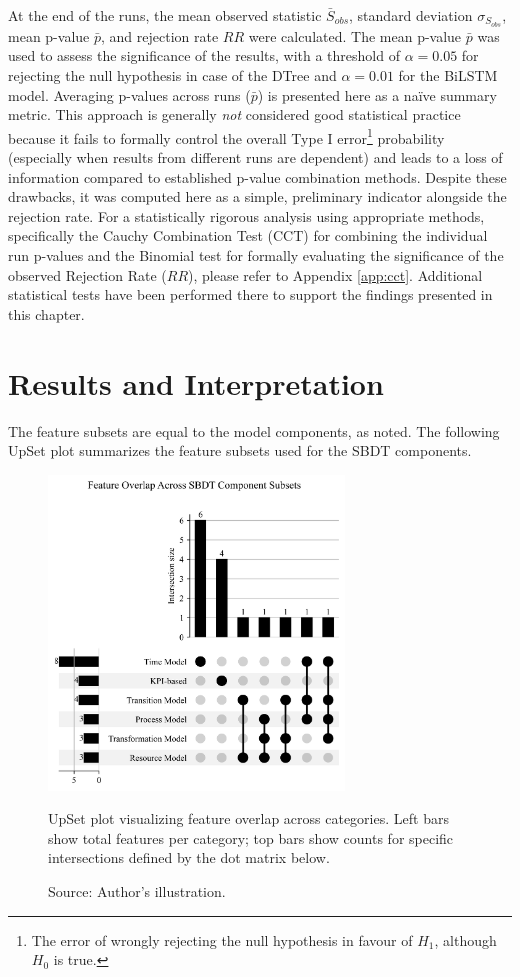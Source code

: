At the end of the runs, the mean observed statistic $\bar{S}_{obs}$, standard deviation $\sigma_{S_{obs}}$, mean p-value $\bar{p}$, and rejection rate $RR$ were calculated. The mean p-value $\bar{p}$ was used to assess the significance of the results, with a threshold of $\alpha = 0.05$ for rejecting the null hypothesis in case of the DTree and $\alpha = 0.01$ for the BiLSTM model. Averaging p-values across runs ($\bar{p}$) is presented here as a naïve summary metric. This approach is generally \textit{not} considered good statistical practice because it fails to formally control the overall Type I error\footnote{The error of wrongly rejecting the null hypothesis in favour of $H_1$, although $H_0$ is true.} probability (especially when results from different runs are dependent) and leads to a loss of information compared to established p-value combination methods. Despite these drawbacks, it was computed here as a simple, preliminary indicator alongside the rejection rate. For a statistically rigorous analysis using appropriate methods, specifically the Cauchy Combination Test (CCT) for combining the individual run p-values and the Binomial test for formally evaluating the significance of the observed Rejection Rate ($RR$), please refer to Appendix \ref{app:cct}. Additional statistical tests have been performed there to support the findings presented in this chapter.

\section{Results and Interpretation}
The feature subsets are equal to the model components, as noted. The following UpSet plot summarizes the feature subsets used for the SBDT components.

\begin{figure}[htbp]
    \centering
    \includegraphics[width=0.7\textwidth]{figures/upset.png}
    \caption[UpSet Plot]{UpSet plot visualizing feature overlap across categories. Left bars show total features per category; top bars show counts for specific intersections defined by the dot matrix below.}
    \caption*{Source: Author's illustration.}
    \label{fig:upsetplot}
\end{figure}

